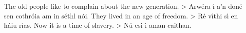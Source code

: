 The old people like to complain about the new generation. > Arw\'{e}ra \'{\i} a’n don\'{e} sen cothr\'{o}ia 
                                                                                                  am in s\'{e}thl n\'{o}i.
They lived in an age of freedom. > R\'{e} v\'{\i}thi s\'{\i} en h\'{a}iu r\'{\i}as.
Now it is a time of slavery. > N\'{u} esi \'{\i} aman caithan.
